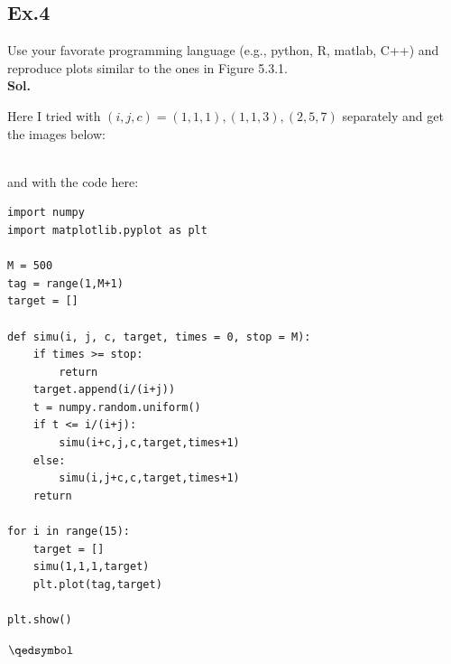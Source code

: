 \documentclass[lang=en,11pt,a4paper,citestyle =authoryear]{elegantpaper}
\newcommand{\prvd}{$\hfill \qedsymbol$}
\begin{document}
\subsection*{Ex.4} 
Use your favorate programming language (e.g., python, R, matlab, C++) and reproduce plots
similar to the ones in Figure 5.3.1.
\vspace{0.5em}\\
\textbf{Sol.} \par
Here I tried with $(i,j,c) = (1,1,1), (1,1,3), (2,5,7)$ separately and get the images below:
\begin{figure}[htbp]
    \centering
\end{figure}\\
and with the code here:\par
\begin{lstlisting}
import numpy
import matplotlib.pyplot as plt

M = 500
tag = range(1,M+1)
target = []

def simu(i, j, c, target, times = 0, stop = M):
    if times >= stop:
        return
    target.append(i/(i+j))
    t = numpy.random.uniform()
    if t <= i/(i+j):
        simu(i+c,j,c,target,times+1)
    else:
        simu(i,j+c,c,target,times+1)
    return

for i in range(15):
    target = []
    simu(1,1,1,target)
    plt.plot(tag,target)

plt.show()
\end{lstlisting}
\prvd
\vspace{0.5em}
\end{document}
